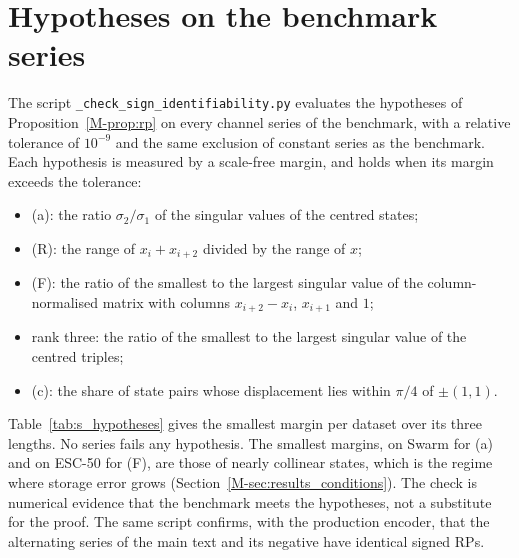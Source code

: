 \documentclass[preprint,12pt]{elsarticle}
\newcommand{\partheading}[1]{\bigskip\noindent{\large\bfseries #1}\par\nobreak\smallskip}
\begin{document}
\section{Hypotheses on the benchmark series}\label{sec:s_hypotheses}
The script \texttt{\_check\_sign\_identifiability.py} evaluates the hypotheses of Proposition~\ref{M-prop:rp} on every channel series of the benchmark, with a relative tolerance of $10^{-9}$ and the same exclusion of constant series as the benchmark. Each hypothesis is measured by a scale-free margin, and holds when its margin exceeds the tolerance:
\begin{itemize}
\item (a): the ratio $\sigma_2/\sigma_1$ of the singular values of the centred states;
\item (R): the range of $x_i+x_{i+2}$ divided by the range of $x$;
\item (F): the ratio of the smallest to the largest singular value of the column-normalised matrix with columns $x_{i+2}-x_i$, $x_{i+1}$ and $1$;
\item rank three: the ratio of the smallest to the largest singular value of the centred triples;
\item (c): the share of state pairs whose displacement lies within $\pi/4$ of $\pm(1,1)$.
\end{itemize}
Table~\ref{tab:s_hypotheses} gives the smallest margin per dataset over its three lengths. No series fails any hypothesis. The smallest margins, on Swarm for (a) and on ESC-50 for (F), are those of nearly collinear states, which is the regime where storage error grows (Section~\ref{M-sec:results_conditions}). The check is numerical evidence that the benchmark meets the hypotheses, not a substitute for the proof. The same script confirms, with the production encoder, that the alternating series of the main text and its negative have identical signed RPs.

\begin{table}[H]
\centering
\caption{Hypotheses of Proposition~\ref{M-prop:rp} on every benchmark series: smallest margin per dataset over $T\in\{64,128,256\}$, and number of series that fail any of (a)--(c).}\label{tab:s_hypotheses}
\footnotesize
\setlength{\tabcolsep}{4pt}
\resizebox{\textwidth}{!}{}
\end{table}

\partheading{Part C. Additional results}
\end{document}
